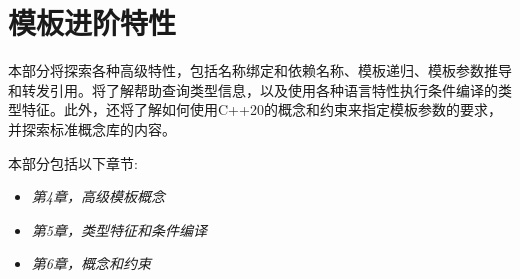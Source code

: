 \part{模板进阶特性}
本部分将探索各种高级特性，包括名称绑定和依赖名称、模板递归、模板参数推导和转发引用。将了解帮助查询类型信息，以及使用各种语言特性执行条件编译的类型特征。此外，还将了解如何使用C++20的概念和约束来指定模板参数的要求，并探索标准概念库的内容。

本部分包括以下章节:

\begin{itemize}
  \item \textit{第4章，高级模板概念}
  \item \textit{第5章，类型特征和条件编译}
  \item \textit{第6章，概念和约束}
\end{itemize}



